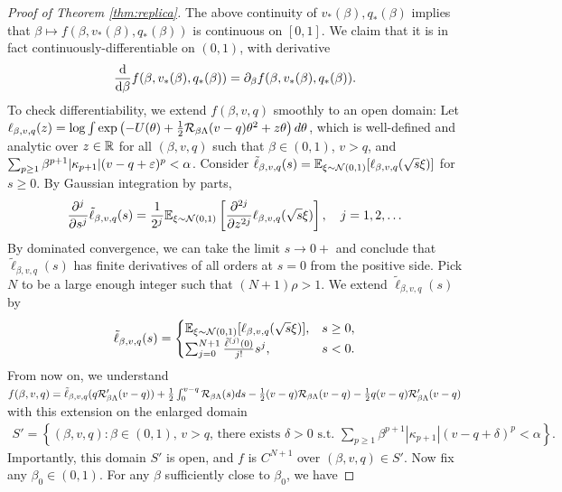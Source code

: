 \begin{proof}[Proof of Theorem \ref{thm:replica}]
The above continuity of $v_*(\beta),q_*(\beta)$ implies that
$\beta \mapsto f(\beta,v_*(\beta),q_*(\beta))$ is continuous on $[0,1]$. We
claim that it is in fact continuously-differentiable on $(0,1)$, with derivative
\begin{equation}\label{eq:fbetacontdiff}
\frac{\mathrm{d}}{\mathrm{d} \beta}
f(\beta,v_*(\beta),q_*(\beta))
=\partial_\beta f(\beta,v_*(\beta),q_*(\beta)).
\end{equation}
To check differentiability, we extend $f(\beta,v,q)$ smoothly to an open domain: Let $\ell_{\beta, v, q}(z) = \log \int \exp\left(-U(\theta)+\frac{1}{2}\mathcal{R}_{\beta\Lambda}(v-q)\theta^2 + z\theta\right) d\theta$,  which is well-defined and analytic over $z \in \mathbb{R}$ for all $(\beta, v, q)$ such that $\beta \in (0,1)$, $v>q$, and $\sum_{p \geq 1} \beta^{p+1}|\kappa_{p+1}|(v-q+\varepsilon)^p< \alpha$. Consider $\tilde{\ell}_{\beta,v,q}(s) = \mathbb{E}_{\xi \sim \mathcal{N}(0,1)}[\ell_{\beta,v,q}(\sqrt{s}\xi)]$ for $s \ge 0$. By Gaussian integration by parts, \[
\frac{\partial^j}{\partial s^j} \tilde{\ell}_{\beta,v,q}(s) =\frac{1}{2^j} \mathbb{E}_{\xi \sim \mathcal{N}(0,1)}\left[\frac{\partial^{2j}}{\partial z^{2j}} \ell_{\beta,v,q}(\sqrt{s}\xi)\right], \quad j = 1,2,\ldots
\]
By dominated convergence, we can take the limit $s \to 0+$ and conclude that $\tilde{\ell}_{\beta,v,q}(s)$ has finite derivatives of all orders at $s = 0$ from the positive side. Pick $N$ to be a large enough integer such that $(N+1)\rho > 1$. We extend $\tilde \ell_{\beta,v,q}(s)$ by \begin{align}
   \nonumber \tilde \ell_{\beta,v,q}(s) = \begin{cases}
    \mathbb{E}_{\xi \sim \mathcal{N}(0,1)}[\ell_{\beta,v,q}(\sqrt{s}\xi)], & s \ge 0,\\
    \sum_{j=0}^{N+1} \frac{\tilde \ell^{(j)}(0)}{j!} s^j, & s < 0.
    \end{cases}
\end{align}
From now on, we understand $f(\beta,v,q) = \tilde \ell_{\beta,v,q}(q\mathcal{R}_{\beta\Lambda}'(v-q)) + \frac{1}{2}\int_0^{v-q} \mathcal{R}_{\beta\Lambda}(s) ds - \frac{1}{2}(v-q)\mathcal{R}_{\beta\Lambda}(v-q) - \frac{1}{2}q(v-q)\mathcal{R}_{\beta\Lambda}'(v-q)$ with this extension on the enlarged domain
\begin{align}
   \nonumber  S' = \left\{(\beta,v,q): \beta \in (0,1),\,v > q,\,\text{there exists } \delta>0\text{ s.t. }\sum_{p \ge 1} \beta^{p+1}|\kappa_{p+1}|(v-q+\delta)^p < \alpha\right\}.
\end{align}
Importantly, this domain $S'$ is open, and $f$ is $C^{N+1}$ over $(\beta,v,q) \in S'$. Now fix any $\beta_0 \in (0,1)$. For any $\beta$ sufficiently close to $\beta_0$, we have

\end{proof}
